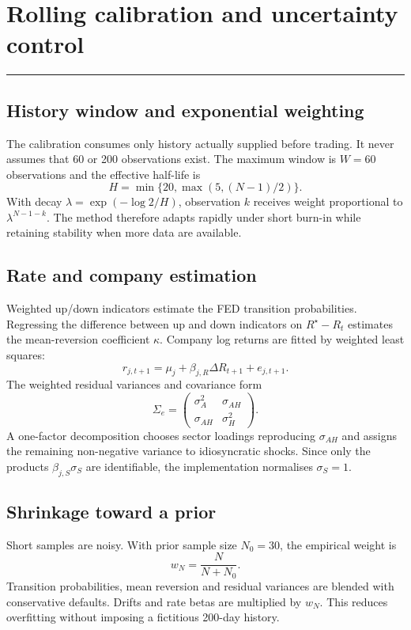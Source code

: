 \documentclass[10pt,a4paper]{article}
\newcommand{\1}{\mathbf{1}}
\newcommand{\sectionrule}{\vspace{-2pt}\noindent\color{navy}\rule{\textwidth}{0.7pt}\color{black}\vspace{2pt}}
\begin{document}
\clearpage

\section{Rolling calibration and uncertainty control}
\sectionrule

\subsection{History window and exponential weighting}
The calibration consumes only history actually supplied before trading.  It never
assumes that 60 or 200 observations exist.  The maximum window is
$W=60$ observations and the effective half-life is
\[
 H=\min\{20,\max(5,(N-1)/2)\}.
\]
With decay $\lambda=\exp(-\log2/H)$, observation $k$ receives weight proportional to
$\lambda^{N-1-k}$.  The method therefore adapts rapidly under short burn-in while
retaining stability when more data are available.

\subsection{Rate and company estimation}
Weighted up/down indicators estimate the FED transition probabilities.  Regressing the
difference between up and down indicators on $R^\star-R_t$ estimates the mean-reversion
coefficient $\kappa$.  Company log returns are fitted by weighted least squares:
\[
 r_{j,t+1}=\mu_j+\beta_{j,R}\Delta R_{t+1}+e_{j,t+1}.
\]
The weighted residual variances and covariance form
\[
 \Sigma_e=
 \begin{pmatrix}
 \sigma_A^2&\sigma_{AH}\\
 \sigma_{AH}&\sigma_H^2
 \end{pmatrix}.
\]
A one-factor decomposition chooses sector loadings reproducing $\sigma_{AH}$ and
assigns the remaining non-negative variance to idiosyncratic shocks.  Since only the
products $\beta_{j,S}\sigma_S$ are identifiable, the implementation normalises
$\sigma_S=1$.

\subsection{Shrinkage toward a prior}
Short samples are noisy.  With prior sample size $N_0=30$, the empirical weight is
\[
 w_N=\frac{N}{N+N_0}.
\]
Transition probabilities, mean reversion and residual variances are blended with
conservative defaults.  Drifts and rate betas are multiplied by $w_N$.  This reduces
overfitting without imposing a fictitious 200-day history.
\end{document}
